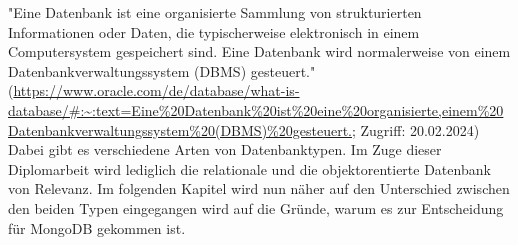 "Eine Datenbank ist eine organisierte Sammlung von strukturierten Informationen oder Daten, die typischerweise elektronisch in einem Computersystem gespeichert sind. Eine Datenbank wird normalerweise von einem Datenbankverwaltungssystem (DBMS) gesteuert."
\newline
(\url{https://www.oracle.com/de/database/what-is-database/#:~:text=Eine%20Datenbank%20ist%20eine%20organisierte,einem%20Datenbankverwaltungssystem%20(DBMS)%20gesteuert.}; Zugriff: 20.02.2024)
\newline
Dabei gibt es verschiedene Arten von Datenbanktypen. Im Zuge dieser Diplomarbeit wird lediglich die relationale und die objektorentierte Datenbank von Relevanz. Im folgenden Kapitel wird nun näher auf den Unterschied zwischen den beiden Typen eingegangen wird auf die Gründe, warum es zur Entscheidung für MongoDB gekommen ist.
\cite{database_basics}